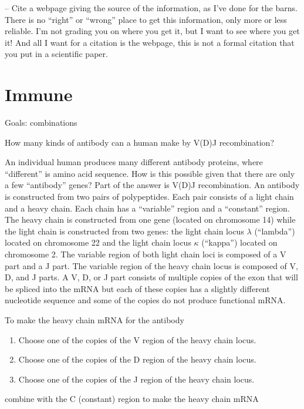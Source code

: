 \documentclass[]{book}
\begin{document}
-- Cite a webpage giving the source of the information, as I've done for
the barns. There is no ``right'' or ``wrong'' place to get this
information, only more or less reliable. I'm not grading you on where
you get it, but I want to see where you get it! And all I want for a
citation is the webpage, this is not a formal citation that you put in a
scientific paper.

\chapter{Immune}\label{immune}

Goals: combinations

How many kinds of antibody can a human make by V(D)J recombination?

An individual human produces many different antibody proteins, where
``different'' is amino acid sequence. How is this possible given that
there are only a few ``antibody'' genes? Part of the answer is V(D)J
recombination. An antibody is constructed from two pairs of
polypeptides. Each pair consists of a light chain and a heavy chain.
Each chain has a ``variable'' region and a ``constant'' region. The
heavy chain is constructed from one gene (located on chromosome 14)
while the light chain is constructed from two genes: the light chain
locus \(\lambda\) (``lambda'') located on chromosome 22 and the light
chain locus \(\kappa\) (``kappa'') located on chromosome 2. The variable
region of both light chain loci is composed of a V part and a J part.
The variable region of the heavy chain locus is composed of V, D, and J
parts. A V, D, or J part consists of multiple copies of the exon that
will be spliced into the mRNA but each of these copies has a slightly
different nucleotide sequence and some of the copies do not produce
functional mRNA.

To make the heavy chain mRNA for the antibody

\begin{enumerate}
\def\labelenumi{\arabic{enumi}.}
\item
  Choose one of the copies of the V region of the heavy chain locus.
\item
  Choose one of the copies of the D region of the heavy chain locus.
\item
  Choose one of the copies of the J region of the heavy chain locus.
\end{enumerate}

combine with the C (constant) region to make the heavy chain mRNA
\end{document}

